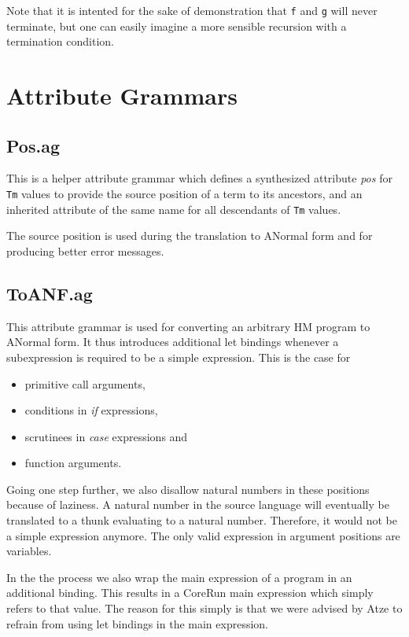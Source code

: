 \documentclass{scrartcl}
\begin{document}
Note that it is intented for the sake of demonstration that \texttt{f} and \texttt{g} will never terminate, but one can easily imagine a more sensible recursion with a termination condition.

\section{Attribute Grammars}

\subsection{Pos.ag}

This is a helper attribute grammar which defines a synthesized attribute \emph{pos} for \lstinline|Tm| values to provide the source position of a term to its ancestors, and an inherited attribute of the same name for all descendants of \lstinline|Tm| values.

The source position is used during the translation to ANormal form and for producing better error messages.

\subsection{ToANF.ag}

This attribute grammar is used for converting an arbitrary HM program to ANormal form. It thus introduces additional let bindings whenever a subexpression is required to be a simple expression. This is the case for

\begin{itemize}
\item primitive call arguments,
\item conditions in \emph{if} expressions,
\item scrutinees in \emph{case} expressions and
\item function arguments.
\end{itemize}

Going one step further, we also disallow natural numbers in these positions because of laziness. A natural number in the source language will eventually be translated to a thunk evaluating to a natural number. Therefore, it would not be a simple expression anymore.
The only valid expression in argument positions are variables.

In the the process we also wrap the main expression of a program in an additional binding. This results in a CoreRun main expression which simply refers to that value.
The reason for this simply is that we were advised by Atze to refrain from using let bindings in the main expression.
\end{document}
